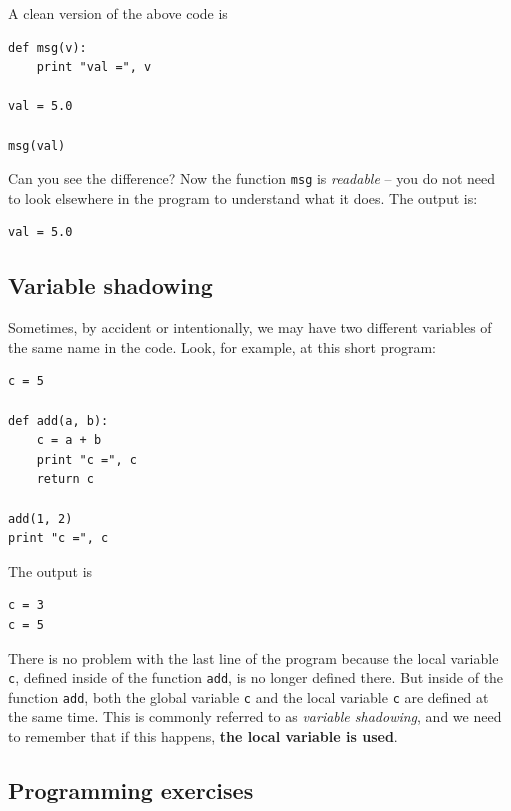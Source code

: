 \noindent
A clean version of the above code is

\begin{verbatim}
def msg(v):
    print "val =", v

val = 5.0

msg(val)
\end{verbatim}
Can you see the difference? Now the function {\tt msg} is {\em readable} -- you do not 
need to look elsewhere in the program to understand what it does. The output is:

\begin{verbatim}
val = 5.0
\end{verbatim}

\subsection{Variable shadowing}

Sometimes, by accident or intentionally, we may have two different 
variables of the same name in the code. Look, for example, at this short program:

\begin{verbatim}
c = 5

def add(a, b):
    c = a + b
    print "c =", c
    return c

add(1, 2)
print "c =", c
\end{verbatim}
The output is

\begin{verbatim}
c = 3
c = 5
\end{verbatim}
There is no 
problem with the last line of the program because the local variable {\tt c}, defined
inside of the function {\tt add}, is no longer defined there. But inside of the function
{\tt add}, both the global variable {\tt c} and the local variable {\tt c} are defined at 
the same time. This is commonly referred to as {\em variable shadowing}, and we need to 
remember that if this happens, {\bf the local variable is used}.



\subsection{Programming exercises}

